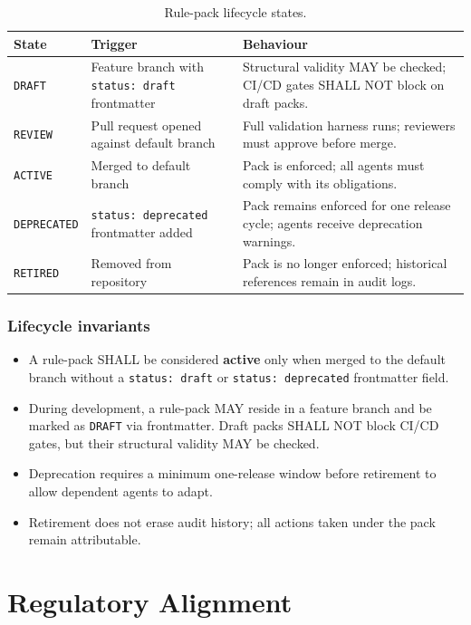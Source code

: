 \documentclass[11pt,a4paper,twoside]{report}
\begin{document}
\begin{table}[htbp]
\centering
\footnotesize
\caption{Rule-pack lifecycle states.}
\label{tab:lifecycle-states}
\begin{tabularx}{\textwidth}{@{}l l X@{}}
\toprule
\textbf{State} & \textbf{Trigger} & \textbf{Behaviour} \\
\midrule
\texttt{DRAFT} & Feature branch with \texttt{status: draft} frontmatter & Structural validity MAY be checked; CI/CD gates SHALL NOT block on draft packs. \\
\texttt{REVIEW} & Pull request opened against default branch & Full validation harness runs; reviewers must approve before merge. \\
\texttt{ACTIVE} & Merged to default branch & Pack is enforced; all agents must comply with its obligations. \\
\texttt{DEPRECATED} & \texttt{status: deprecated} frontmatter added & Pack remains enforced for one release cycle; agents receive deprecation warnings. \\
\texttt{RETIRED} & Removed from repository & Pack is no longer enforced; historical references remain in audit logs. \\
\bottomrule
\end{tabularx}
\end{table}

\subsection{Lifecycle invariants}

\begin{itemize}
\item A rule-pack SHALL be considered \textbf{active} only when merged
to the default branch without a \texttt{status: draft} or
\texttt{status: deprecated} frontmatter field.
\item During development, a rule-pack MAY reside in a feature branch
and be marked as \texttt{DRAFT} via frontmatter. Draft packs SHALL
NOT block CI/CD gates, but their structural validity MAY be checked.
\item Deprecation requires a minimum one-release window before
retirement to allow dependent agents to adapt.
\item Retirement does not erase audit history; all actions taken under
the pack remain attributable.
\end{itemize}
\chapter{Regulatory Alignment}
\label{ch:reg-alignment}
\end{document}
